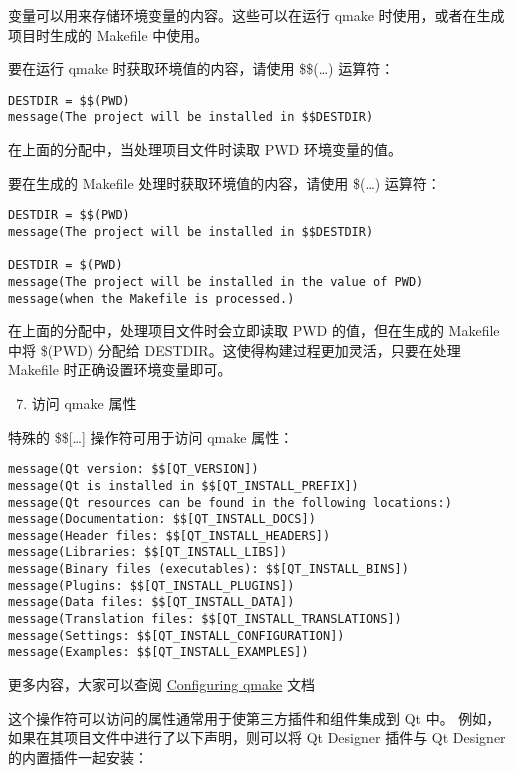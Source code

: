 变量可以用来存储环境变量的内容。这些可以在运行 qmake
时使用，或者在生成项目时生成的 Makefile 中使用。

要在运行 qmake 时获取环境值的内容，请使用 \$\$(\ldots{}) 运算符：

\begin{verbatim}
DESTDIR = $$(PWD)
message(The project will be installed in $$DESTDIR)
\end{verbatim}

在上面的分配中，当处理项目文件时读取 PWD 环境变量的值。

要在生成的 Makefile 处理时获取环境值的内容，请使用 \$(\ldots{}) 运算符：

\begin{verbatim}
DESTDIR = $$(PWD)
message(The project will be installed in $$DESTDIR)

DESTDIR = $(PWD)
message(The project will be installed in the value of PWD)
message(when the Makefile is processed.)
\end{verbatim}

在上面的分配中，处理项目文件时会立即读取 PWD 的值，但在生成的 Makefile
中将 \$(PWD) 分配给 DESTDIR。这使得构建过程更加灵活，只要在处理 Makefile
时正确设置环境变量即可。

\begin{enumerate}
\setcounter{enumi}{6}

\item
  访问 qmake 属性
\end{enumerate}

特殊的 \$\${[}\ldots{}{]} 操作符可用于访问 qmake 属性：

\begin{verbatim}
message(Qt version: $$[QT_VERSION])
message(Qt is installed in $$[QT_INSTALL_PREFIX])
message(Qt resources can be found in the following locations:)
message(Documentation: $$[QT_INSTALL_DOCS])
message(Header files: $$[QT_INSTALL_HEADERS])
message(Libraries: $$[QT_INSTALL_LIBS])
message(Binary files (executables): $$[QT_INSTALL_BINS])
message(Plugins: $$[QT_INSTALL_PLUGINS])
message(Data files: $$[QT_INSTALL_DATA])
message(Translation files: $$[QT_INSTALL_TRANSLATIONS])
message(Settings: $$[QT_INSTALL_CONFIGURATION])
message(Examples: $$[QT_INSTALL_EXAMPLES])
\end{verbatim}

更多内容，大家可以查阅
\href{https://link.jianshu.com?t=https://doc.qt.io/qt-5/qmake-environment-reference.html}{Configuring
qmake} 文档

这个操作符可以访问的属性通常用于使第三方插件和组件集成到 Qt 中。
例如，如果在其项目文件中进行了以下声明，则可以将 Qt Designer 插件与 Qt
Designer 的内置插件一起安装：

